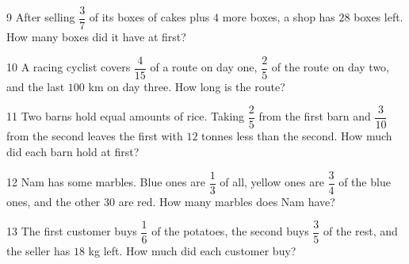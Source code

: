 \gap
\begin{probbox}{9}{\relax}
After selling $\dfrac37$ of its boxes of cakes plus $4$ more boxes, a shop has $28$ boxes left. How many boxes did it have at first?
\end{probbox}
\gap
\begin{probbox}{10}{\relax}
A racing cyclist covers $\dfrac4{15}$ of a route on day one, $\dfrac25$ of the route on day two, and the last $100$ km on day three. How long is the route?
\end{probbox}
\gap
\begin{probbox}{11}{\relax}
Two barns hold equal amounts of rice. Taking $\dfrac25$ from the first barn and $\dfrac3{10}$ from the second leaves the first with $12$ tonnes less than the second. How much did each barn hold at first?
\end{probbox}
\gap
\begin{probbox}{12}{\relax}
Nam has some marbles. Blue ones are $\dfrac13$ of all, yellow ones are $\dfrac34$ of the blue ones, and the other $30$ are red. How many marbles does Nam have?
\end{probbox}
\gap
\begin{probbox}{13}{\relax}
The first customer buys $\dfrac16$ of the potatoes, the second buys $\dfrac35$ of the rest, and the seller has $18$ kg left. How much did each customer buy?
\end{probbox}
